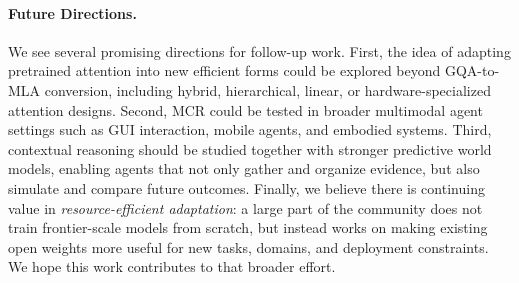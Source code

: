 \documentclass[11pt, letterpaper]{template}
\theoremstyle{plain}
\theoremstyle{definition}
\theoremstyle{remark}
\begin{document}
\paragraph{Future Directions.}
We see several promising directions for follow-up work. First, the idea of adapting pretrained attention into new efficient forms could be explored beyond GQA-to-MLA conversion, including hybrid, hierarchical, linear, or hardware-specialized attention designs. Second, MCR could be tested in broader multimodal agent settings such as GUI interaction, mobile agents, and embodied systems. Third, contextual reasoning should be studied together with stronger predictive world models, enabling agents that not only gather and organize evidence, but also simulate and compare future outcomes. Finally, we believe there is continuing value in \emph{resource-efficient adaptation}: a large part of the community does not train frontier-scale models from scratch, but instead works on making existing open weights more useful for new tasks, domains, and deployment constraints. We hope this work contributes to that broader effort.

\clearpage



\clearpage
\appendix
\end{document}
